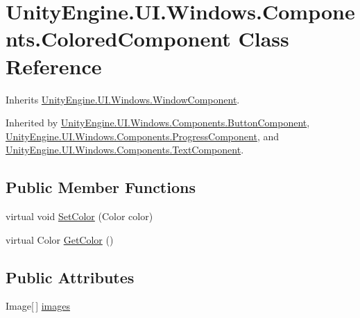 \hypertarget{class_unity_engine_1_1_u_i_1_1_windows_1_1_components_1_1_colored_component}{}\section{Unity\+Engine.\+U\+I.\+Windows.\+Components.\+Colored\+Component Class Reference}
\label{class_unity_engine_1_1_u_i_1_1_windows_1_1_components_1_1_colored_component}


Inherits \hyperlink{class_unity_engine_1_1_u_i_1_1_windows_1_1_window_component}{Unity\+Engine.\+U\+I.\+Windows.\+Window\+Component}.



Inherited by \hyperlink{class_unity_engine_1_1_u_i_1_1_windows_1_1_components_1_1_button_component}{Unity\+Engine.\+U\+I.\+Windows.\+Components.\+Button\+Component}, \hyperlink{class_unity_engine_1_1_u_i_1_1_windows_1_1_components_1_1_progress_component}{Unity\+Engine.\+U\+I.\+Windows.\+Components.\+Progress\+Component}, and \hyperlink{class_unity_engine_1_1_u_i_1_1_windows_1_1_components_1_1_text_component}{Unity\+Engine.\+U\+I.\+Windows.\+Components.\+Text\+Component}.

\subsection*{Public Member Functions}
\begin{DoxyCompactItemize}
\item 
virtual void \hyperlink{class_unity_engine_1_1_u_i_1_1_windows_1_1_components_1_1_colored_component_a974f3b5d7da183afd669d1714dfa8ab1}{Set\+Color} (Color color)
\item 
virtual Color \hyperlink{class_unity_engine_1_1_u_i_1_1_windows_1_1_components_1_1_colored_component_abd773c8d8290ffe65f6a7c1ced64e280}{Get\+Color} ()
\end{DoxyCompactItemize}
\subsection*{Public Attributes}
\begin{DoxyCompactItemize}
\item 
Image\mbox{[}$\,$\mbox{]} \hyperlink{class_unity_engine_1_1_u_i_1_1_windows_1_1_components_1_1_colored_component_abad5dd27c4fc96fc10cf3a0632bc89fd}{images}
\end{DoxyCompactItemize}


